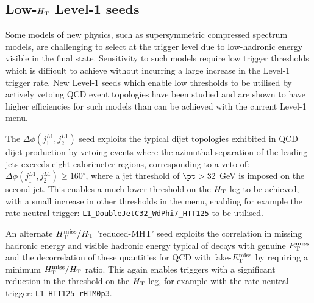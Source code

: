 






\subsection{Low-$\mbox{$H_\text{T}$}$ Level-1 seeds}

Some models of new physics, such as supersymmetric compressed spectrum models, are challenging to select at the trigger level due to low-hadronic energy visible in the final state. Sensitivity to such models require low trigger thresholds which is difficult to achieve without incurring a large increase in the Level-1 trigger rate. New Level-1 seeds which enable low thresholds to be utilised by actively vetoing QCD event topologies have been studied and are shown to have higher efficiencies for such models than can be achieved with the current Level-1 menu.

The $\Delta\phi(j_{1}^{L1},j_{2}^{L1})$ seed exploits the typical dijet topologies exhibited in QCD dijet production by vetoing events where the azimuthal separation of the leading jets exceeds eight calorimeter regions, corresponding to a veto of: $\Delta\phi(j_{1}^{L1},j_{2}^{L1}) \ge 160^{\circ}$, where a jet threshold of $\pt > 32$ GeV is imposed on the second jet. This enables a much lower threshold on the $\mbox{$H_\text{T}$}$-leg to be achieved, with a small increase in other thresholds in the menu, enabling for example the rate neutral trigger: \verb!L1_DoubleJetC32_WdPhi7_HTT125! to be utilised.

An alternate $\mbox{$H_{\rm T}^{\rm miss}$}/\mbox{$H_\text{T}$}$ 'reduced-MHT' seed exploits the correlation in missing hadronic energy and visible hadronic energy typical of decays with genuine $\mbox{$E_\text{T}^{\rm miss}$}$ and the decorrelation of these quantities for QCD with fake-$\mbox{$E_\text{T}^{\rm miss}$}$ by requiring a minimum $\mbox{$H_{\rm T}^{\rm miss}$}/\mbox{$H_\text{T}$}$ ratio. This again enables triggers with a significant reduction in the threshold on the $\mbox{$H_\text{T}$}$-leg, for example with the rate neutral trigger: \verb!L1_HTT125_rHTM0p3!.

